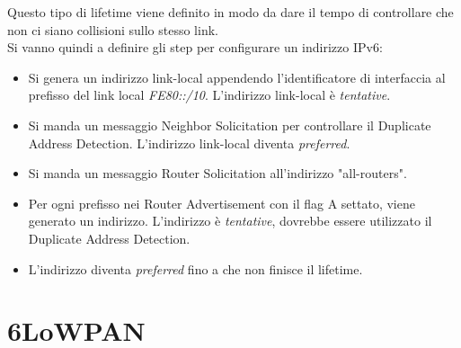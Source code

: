 \documentclass{article}
\begin{document}
Questo tipo di lifetime viene definito in modo da dare il tempo di controllare che non ci siano collisioni sullo stesso link. \\ Si vanno quindi a definire gli step per configurare un indirizzo IPv6:
\begin{itemize}
    \item Si genera un indirizzo link-local appendendo l'identificatore di interfaccia al prefisso del link local \textit{FE80::/10}. L'indirizzo link-local è \textit{tentative}.
    \item Si manda un messaggio Neighbor Solicitation per controllare il Duplicate Address Detection. L'indirizzo link-local diventa \textit{preferred}.
    \item Si manda un messaggio Router Solicitation all'indirizzo "all-routers".
    \item Per ogni prefisso nei Router Advertisement con il flag A settato, viene generato un indirizzo. L'indirizzo è \textit{tentative}, dovrebbe essere utilizzato il Duplicate Address Detection.
    \item L'indirizzo diventa \textit{preferred} fino a che non finisce il lifetime.
\end{itemize}

\newpage
\section{6LoWPAN}
\end{document}
